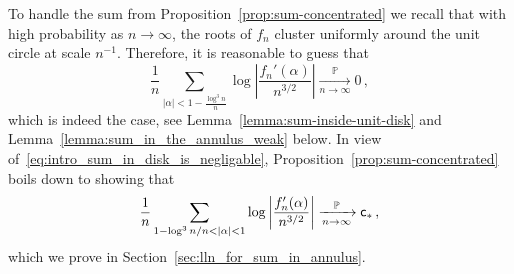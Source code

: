 \documentclass[11pt]{amsart}
\theoremstyle{remark}
\theoremstyle{definition}
\newcommand{\bP}{\mathbb P}
\begin{document}
     To handle the sum from Proposition~\ref{prop:sum-concentrated} we recall that  with high probability as $n\to \infty$, the roots of $f_n$ cluster uniformly around the unit circle at scale $n^{-1}$.
    Therefore, it is reasonable to guess that 
    \begin{equation}
        \label{eq:intro_sum_in_disk_is_negligable}
        \frac{1}{n} \sum_{|\alpha| < 1 - \frac{\log^3n}{n}} \log \left|\frac{f_n'(\alpha)}{n^{3/2}} \right| \xrightarrow[n\to \infty]{\bP} 0\, ,
    \end{equation}
    which is indeed the case, see Lemma~\ref{lemma:sum-inside-unit-disk} and Lemma~\ref{lemma:sum_in_the_annulus_weak} below. In view of~\eqref{eq:intro_sum_in_disk_is_negligable}, Proposition~\ref{prop:sum-concentrated} boils down to showing that 
    $$ \frac{1}{n} \sum_{1- \log^3 n / n < |\alpha| < 1} \log \left| \frac{f_n'(\alpha)}{n^{3/2}}\right| \xrightarrow[n\to \infty]{\bP} {\sf c}_\ast \, ,$$
    which we prove in Section~\ref{sec:lln_for_sum_in_annulus}. 
 
\end{document}
